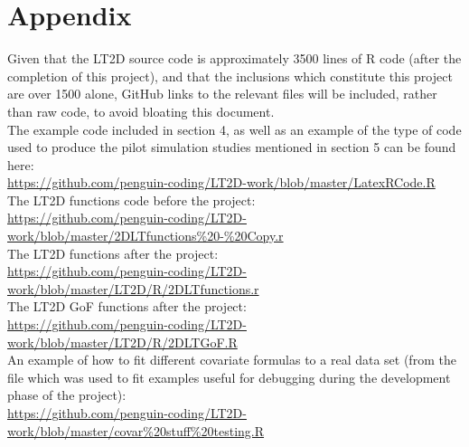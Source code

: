 \documentclass[11pt]{article}
\begin{document}
\section{Appendix}

Given that the LT2D source code is approximately 3500 lines of R code (after the completion of this project), and that the inclusions which constitute this project are over 1500 alone, GitHub links to the relevant files will be included, rather than raw code, to avoid bloating this document.\\

The example code included in section 4, as well as an example of the type of code used to produce the pilot simulation studies mentioned in section 5 can be found here: 
\\
\url{https://github.com/penguin-coding/LT2D-work/blob/master/LatexRCode.R}\\

The LT2D functions code before the project:
\\\url{https://github.com/penguin-coding/LT2D-work/blob/master/2DLTfunctions\%20-\%20Copy.r}\\

The LT2D functions after the project:\\\url{
https://github.com/penguin-coding/LT2D-work/blob/master/LT2D/R/2DLTfunctions.r}\\

The LT2D GoF functions after the project:\\
\url{https://github.com/penguin-coding/LT2D-work/blob/master/LT2D/R/2DLTGoF.R}\\

An example of how to fit different covariate formulas to a real data set (from the file which was used to fit examples useful for debugging during the development phase of the project):\\
\url{https://github.com/penguin-coding/LT2D-work/blob/master/covar\%20stuff\%20testing.R}
\end{document}
